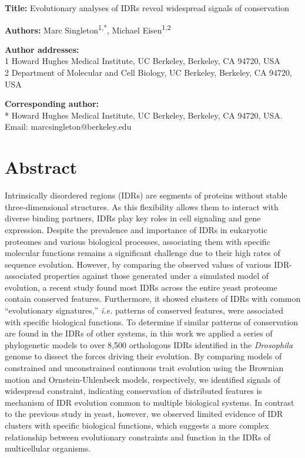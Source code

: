 \textbf{Title:} Evolutionary analyses of IDRs reveal widespread signals of conservation

\textbf{Authors:} Marc Singleton\textsuperscript{1,*}, Michael Eisen\textsuperscript{1,2}

\textbf{Author addresses:}\\
1 Howard Hughes Medical Institute, UC Berkeley, Berkeley, CA 94720, USA\\
2 Department of Molecular and Cell Biology, UC Berkeley, Berkeley, CA 94720, USA

\textbf{Corresponding author:}\\
* Howard Hughes Medical Institute, UC Berkeley, Berkeley, CA 94720, USA. Email: marcsingleton@berkeley.edu

\clearpage

\section{Abstract}
Intrinsically disordered regions (IDRs) are segments of proteins without stable three-dimensional structures. As this flexibility allows them to interact with diverse binding partners, IDRs play key roles in cell signaling and gene expression. Despite the prevalence and importance of IDRs in eukaryotic proteomes and various biological processes, associating them with specific molecular functions remains a significant challenge due to their high rates of sequence evolution. However, by comparing the observed values of various IDR-associated properties against those generated under a simulated model of evolution, a recent study found most IDRs across the entire yeast proteome contain conserved features. Furthermore, it showed clusters of IDRs with common ``evolutionary signatures,'' \textit{i.e.} patterns of conserved features, were associated with specific biological functions. To determine if similar patterns of conservation are found in the IDRs of other systems, in this work we applied a series of phylogenetic models to over 8,500 orthologous IDRs identified in the \textit{Drosophila} genome to dissect the forces driving their evolution. By comparing models of constrained and unconstrained continuous trait evolution using the Brownian motion and Ornstein-Uhlenbeck models, respectively, we identified signals of widespread constraint, indicating conservation of distributed features is mechanism of IDR evolution common to multiple biological systems. In contrast to the previous study in yeast, however, we observed limited evidence of IDR clusters with specific biological functions, which suggests a more complex relationship between evolutionary constraints and function in the IDRs of multicellular organisms.

